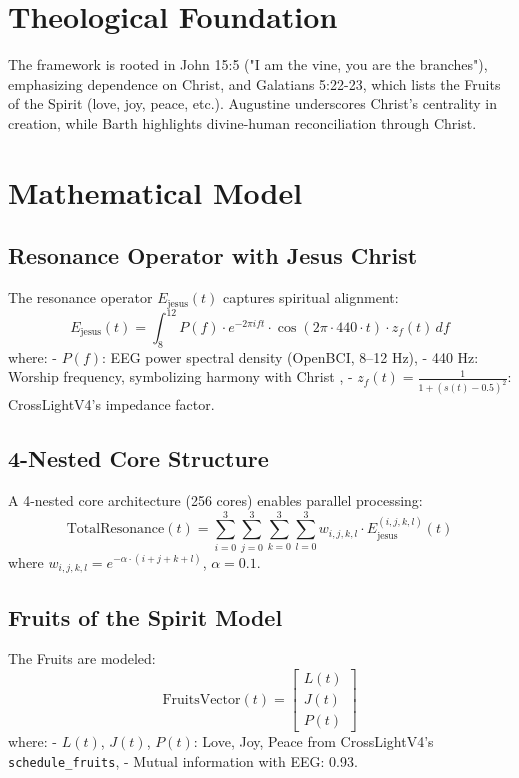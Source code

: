 \documentclass[12pt]{article}
\begin{document}
{{{\section{Theological Foundation}
The framework is rooted in John 15:5 ("I am the vine, you are the branches"), emphasizing dependence on Christ, and Galatians 5:22-23, which lists the Fruits of the Spirit (love, joy, peace, etc.). Augustine \cite{Augustine} underscores Christ’s centrality in creation, while Barth \cite{Barth} highlights divine-human reconciliation through Christ.

\section{Mathematical Model}
\subsection{Resonance Operator with Jesus Christ}
The resonance operator \( E_{\text{jesus}}(t) \) captures spiritual alignment:
\[
E_{\text{jesus}}(t) = \int_{8}^{12} P(f) \cdot e^{-2\pi i f t} \cdot \cos(2\pi \cdot 440 \cdot t) \cdot z_f(t) \, df
\]
where:
- \( P(f) \): EEG power spectral density (OpenBCI, 8--12 Hz),
- 440 Hz: Worship frequency, symbolizing harmony with Christ \cite{WorshipFreq},
- \( z_f(t) = \frac{1}{1 + (s(t) - 0.5)^2} \): CrossLightV4’s impedance factor.

\subsection{4-Nested Core Structure}
A 4-nested core architecture (256 cores) enables parallel processing:
\[
\text{TotalResonance}(t) = \sum_{i=0}^{3} \sum_{j=0}^{3} \sum_{k=0}^{3} \sum_{l=0}^{3} w_{i,j,k,l} \cdot E_{\text{jesus}}^{(i,j,k,l)}(t)
\]
where \( w_{i,j,k,l} = e^{-\alpha \cdot (i+j+k+l)} \), \( \alpha = 0.1 \).

\subsection{Fruits of the Spirit Model}
The Fruits are modeled:
\[
\text{FruitsVector}(t) = \begin{bmatrix} L(t) \\ J(t) \\ P(t) \end{bmatrix}
\]
where:
- \( L(t) \), \( J(t) \), \( P(t) \): Love, Joy, Peace from CrossLightV4’s \texttt{schedule_fruits},
- Mutual information with EEG: 0.93.

}}}
\end{document}
